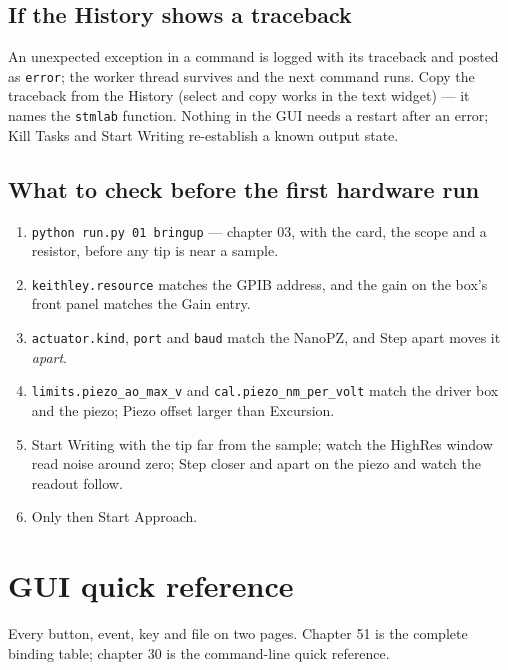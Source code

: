 \section{If the History shows a traceback}

An unexpected exception in a command is logged with its traceback and posted as \texttt{error}; the worker thread survives and the next command runs. Copy the traceback from the History (select and copy works in the text widget) --- it names the \texttt{stmlab} function. Nothing in the GUI needs a restart after an error; Kill Tasks and Start Writing re-establish a known output state.

\section{What to check before the first hardware run}

\begin{enumerate}[leftmargin=*]
\item \texttt{python run.\discretionary{}{}{}py 01 bringup} --- chapter 03, with the card, the scope and a resistor, before any tip is near a sample.
\item \texttt{keithley.\discretionary{}{}{}resource} matches the GPIB address, and the gain on the box's front panel matches the Gain entry.
\item \texttt{actuator.\discretionary{}{}{}kind}, \texttt{port} and \texttt{baud} match the NanoPZ, and Step apart moves it \emph{apart}.
\item \texttt{limits.\discretionary{}{}{}piezo\_\discretionary{}{}{}ao\_\discretionary{}{}{}max\_\discretionary{}{}{}v} and \texttt{cal.\discretionary{}{}{}piezo\_\discretionary{}{}{}nm\_\discretionary{}{}{}per\_\discretionary{}{}{}volt} match the driver box and the piezo; Piezo offset larger than Excursion.
\item Start Writing with the tip far from the sample; watch the HighRes window read noise around zero; Step closer and apart on the piezo and watch the readout follow.
\item Only then Start Approach.
\end{enumerate}

\setcounter{chapter}{49}
\chapter{GUI quick reference}

\begin{keybox}\small Every button, event, key and file on two pages. Chapter 51 is the complete binding table; chapter 30 is the command-line quick reference.\end{keybox}

